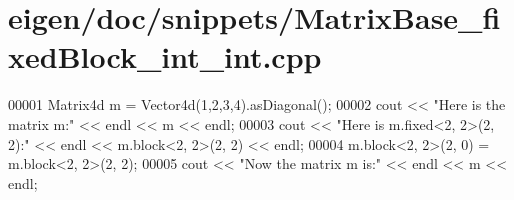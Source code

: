\hypertarget{eigen_2doc_2snippets_2_matrix_base__fixed_block__int__int_8cpp_source}{}\section{eigen/doc/snippets/\+Matrix\+Base\+\_\+fixed\+Block\+\_\+int\+\_\+int.cpp}
\label{eigen_2doc_2snippets_2_matrix_base__fixed_block__int__int_8cpp_source}

\begin{DoxyCode}
00001 Matrix4d m = Vector4d(1,2,3,4).asDiagonal();
00002 cout << \textcolor{stringliteral}{"Here is the matrix m:"} << endl << m << endl;
00003 cout << \textcolor{stringliteral}{"Here is m.fixed<2, 2>(2, 2):"} << endl << m.block<2, 2>(2, 2) << endl;
00004 m.block<2, 2>(2, 0) = m.block<2, 2>(2, 2);
00005 cout << \textcolor{stringliteral}{"Now the matrix m is:"} << endl << m << endl;
\end{DoxyCode}
